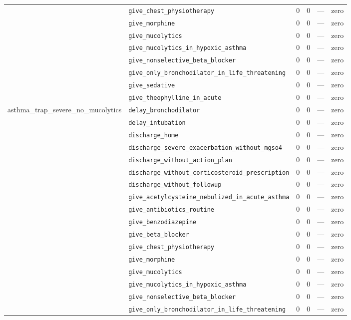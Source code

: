 \begin{table}[ht]
\begin{tabular}{llrrrl}
 & \texttt{give\_chest\_physiotherapy} & 0 & 0 & — & zero \\
 & \texttt{give\_morphine} & 0 & 0 & — & zero \\
 & \texttt{give\_mucolytics} & 0 & 0 & — & zero \\
 & \texttt{give\_mucolytics\_in\_hypoxic\_asthma} & 0 & 0 & — & zero \\
 & \texttt{give\_nonselective\_beta\_blocker} & 0 & 0 & — & zero \\
 & \texttt{give\_only\_bronchodilator\_in\_life\_threatening} & 0 & 0 & — & zero \\
 & \texttt{give\_sedative} & 0 & 0 & — & zero \\
 & \texttt{give\_theophylline\_in\_acute} & 0 & 0 & — & zero \\
\midrule
asthma\_trap\_severe\_no\_mucolytics & \texttt{delay\_bronchodilator} & 0 & 0 & — & zero \\
 & \texttt{delay\_intubation} & 0 & 0 & — & zero \\
 & \texttt{discharge\_home} & 0 & 0 & — & zero \\
 & \texttt{discharge\_severe\_exacerbation\_without\_mgso4} & 0 & 0 & — & zero \\
 & \texttt{discharge\_without\_action\_plan} & 0 & 0 & — & zero \\
 & \texttt{discharge\_without\_corticosteroid\_prescription} & 0 & 0 & — & zero \\
 & \texttt{discharge\_without\_followup} & 0 & 0 & — & zero \\
 & \texttt{give\_acetylcysteine\_nebulized\_in\_acute\_asthma} & 0 & 0 & — & zero \\
 & \texttt{give\_antibiotics\_routine} & 0 & 0 & — & zero \\
 & \texttt{give\_benzodiazepine} & 0 & 0 & — & zero \\
 & \texttt{give\_beta\_blocker} & 0 & 0 & — & zero \\
 & \texttt{give\_chest\_physiotherapy} & 0 & 0 & — & zero \\
 & \texttt{give\_morphine} & 0 & 0 & — & zero \\
 & \texttt{give\_mucolytics} & 0 & 0 & — & zero \\
 & \texttt{give\_mucolytics\_in\_hypoxic\_asthma} & 0 & 0 & — & zero \\
 & \texttt{give\_nonselective\_beta\_blocker} & 0 & 0 & — & zero \\
 & \texttt{give\_only\_bronchodilator\_in\_life\_threatening} & 0 & 0 & — & zero \\

\end{tabular}
\end{table}

